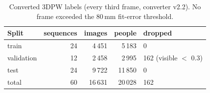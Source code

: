 
\begin{table}[h]
\centering\small
\begin{tabular}{lrrrl}
\toprule
Split & sequences & images & people & dropped \\
\midrule
train & 24 & 4\,451 & 5\,183 & 0 \\
validation & 12 & 2\,458 & 2\,995 & 162 (visible $<$ 0.3) \\
test & 24 & 9\,722 & 11\,850 & 0 \\
\midrule
total & 60 & 16\,631 & 20\,028 & 162 \\
\bottomrule
\end{tabular}
\caption{Converted 3DPW labels (every third frame, converter v2.2). No frame
exceeded the 80\,mm fit-error threshold.}
\label{tab:labels}
\end{table}
